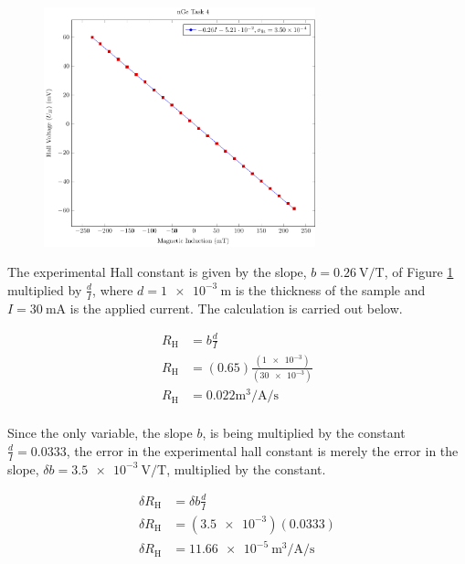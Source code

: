\documentclass[a4paper]{article}
\begin{document}
\begin{figure}[H]
\centering
\includegraphics[width=0.7\textwidth]{NGePlots/Task4/nGeTask4.pdf}
\label{task34plot}
\end{figure}

\qq The experimental Hall constant is given by the slope, \( b =
\SI{0.26}{\volt\per\tesla} \), of Figure \ref{task34plot}
multiplied by \( \frac{d}{I} \), where \( d = \SI{1e-3}{\meter} \) is the
thickness of the sample and \( I = \SI{30}{\milli\ampere} \) is the applied
current. The calculation is carried 
out below.

\begin{align*}
  R_{\text{H}} &= b \frac{d}{I} \\
  R_{\text{H}} &= (0.65) \frac{(\num{1e-3})}{(\num{30e-3})} \\
  R_{\text{H}} &= \num{0.022}\si{\cubic\meter\per\ampere\per\second} \\
\end{align*}

\qq Since the only variable, the slope \( b \), is being multiplied by the constant
\( \frac{d}{I} = \num{0.0333} \), the error in the experimental hall constant is
merely the error in the slope, \( \delta b = \SI{3.5e-3}{\volt\per\tesla} \),
multiplied by the constant.

\begin{align*}
  \delta R_{\text{H}} &= \delta b \frac{d}{I} \\
  \delta R_{\text{H}} &= (\num{3.5e-3}) (\num{0.0333}) \\
  \delta R_{\text{H}} &= \SI{11.66e-5}{\cubic\meter\per\ampere\per\second} \\
\end{align*}
\end{document}
